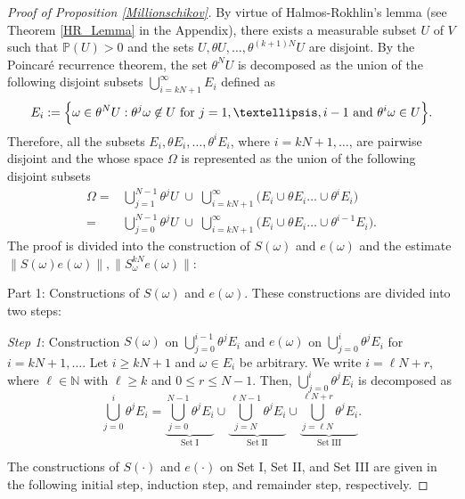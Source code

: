 \documentclass[10pt,a4paper]{amsart}
\newcommand{\N}{\mathbb{N}}
\newcommand{\mP}{\mathbb{P}}
\begin{document}
\begin{proof}[Proof of Proposition \ref{Millionschikov}]
By virtue of Halmos-Rokhlin's lemma (see Theorem \ref{HR_Lemma} in the Appendix), there exists a measurable subset $U$ of $V$ such that  $\mP(U)>0$ and the sets $U,\theta U,\dots,\theta^{(k+1)N}U$ are disjoint. By the Poincar\'{e} recurrence theorem, the set $\theta^NU$ is decomposed as the union of the following disjoint subsets $\bigcup_{i={kN+1}}^{\infty} E_i$ defined as 
\begin{equation*}\label{DecomposeofU}
E_i:=\Big\{\omega\in\theta^N U: \theta^j\omega\not\in U \hbox{ for } j=1,\dots,i-1 \hbox{ and } \theta^i\omega\in U \Big\}.    
\end{equation*}
Therefore, all the subsets $E_i,\theta E_i,\dots,\theta^i E_i$, where $i=kN+1,\dots$, are pairwise disjoint and the whose space $\Omega$ is represented as the union of the following disjoint subsets 
\begin{align}
\Omega
=&  \bigcup_{j=1}^{N-1}\theta^j U\;\cup\; \bigcup_{i=kN+1}^{\infty}  \Big(E_i\cup \theta E_i\dots\cup\theta^i E_i\Big)\label{PresentationOmega_I}\\
=&
 \bigcup_{j=0}^{N-1}\theta^j U\;\cup\; \bigcup_{i=kN+1}^{\infty}  \Big(E_i\cup \theta E_i\dots\cup\theta^{i-1} E_i\Big).\label{PresentationOmega_II}
\end{align}
The proof is divided into the construction of 
$S(\omega)$ and $e(\omega)$ and the estimate $\|S(\omega)e(\omega)\|, \|S^{kN}_{\omega}e(\omega)\|$:

Part 1: Constructions of $S(\omega)$ and $e(\omega)$. These constructions are divided into two steps:

\emph{Step 1}: Construction $S(\omega)$ on $\bigcup_{j=0}^{i-1} \theta^j E_i$ and $e(\omega)$ on $\bigcup_{j=0}^i \theta^j E_i$ for $i=kN+1,\dots$. Let $i\geq kN+1$ and $\omega\in E_i$ be arbitrary.  We write $i=\ell N+r$, where $\ell\in\N$ with $\ell\geq k$ and $0\leq r\leq N-1$. Then, $\bigcup_{j=0}^i \theta^j E_i$ is decomposed as 
\[
\bigcup_{j=0}^i \theta^j E_i
=
\underbrace{\bigcup_{j=0}^{N-1} \theta^j E_i}_{\mathrm{Set\; I}}
\cup 
\underbrace{\bigcup_{j=N}^{\ell N-1} \theta^j E_i}_{\mathrm{Set\; II}}
\cup 
\underbrace{\bigcup_{j=\ell N}^{\ell N+r} \theta^j E_i}_{\mathrm{Set\; III}}.
\]


The constructions of $S(\cdot)$ and $e(\cdot)$ on Set I, Set II, and Set III are given in the following initial step, induction step, and remainder step, respectively.


\end{proof}
\end{document}

